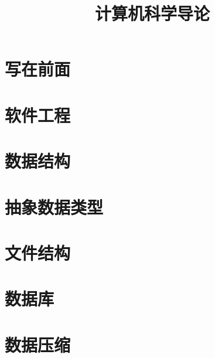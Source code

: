 \documentclass[oneside,a4paper]{book}
\title{计算机科学导论}
\begin{document}
\frontmatter
\maketitle
\chapter{写在前面}

\tableofcontents

\mainmatter






\chapter{软件工程}

\chapter{数据结构}

\chapter{抽象数据类型}

\chapter{文件结构}

\chapter{数据库}

\chapter{数据压缩}

\end{document}
